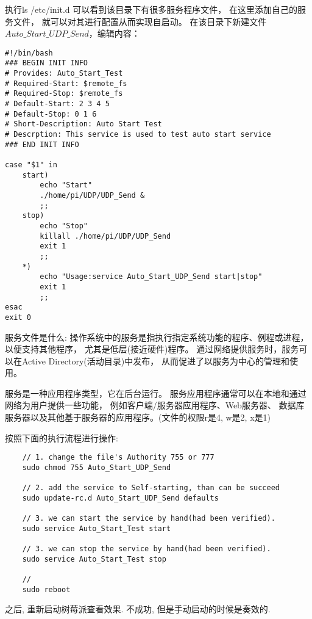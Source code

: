 执行ls /etc/init.d 
可以看到该目录下有很多服务程序文件，
在这里添加自己的服务文件，
就可以对其进行配置从而实现自启动。
在该目录下新建文件 $Auto\_Start\_UDP\_Send$，编辑内容：
\begin{lstlisting}[title=服务文件配置]
#!/bin/bash
### BEGIN INIT INFO
# Provides: Auto_Start_Test
# Required-Start: $remote_fs
# Required-Stop: $remote_fs
# Default-Start: 2 3 4 5
# Default-Stop: 0 1 6
# Short-Description: Auto Start Test 
# Descrption: This service is used to test auto start service
### END INIT INFO

case "$1" in
    start)
        echo "Start"
        ./home/pi/UDP/UDP_Send &
        ;;
    stop)
        echo "Stop"
        killall ./home/pi/UDP/UDP_Send
        exit 1
        ;;
    *)
        echo "Usage:service Auto_Start_UDP_Send start|stop"
        exit 1
        ;;
esac
exit 0
\end{lstlisting}
\par 服务文件是什么: 
操作系统中的服务是指执行指定系统功能的程序、例程或进程，以便支持其他程序，
尤其是低层(接近硬件)程序。
通过网络提供服务时，服务可以在Active Directory(活动目录)中发布，
从而促进了以服务为中心的管理和使用。
\par 服务是一种应用程序类型，它在后台运行。
服务应用程序通常可以在本地和通过网络为用户提供一些功能，
例如客户端/服务器应用程序、Web服务器、
数据库服务器以及其他基于服务器的应用程序。(文件的权限r是4, w是2, x是1)
\par 按照下面的执行流程进行操作:
\begin{lstlisting}
    // 1. change the file's Authority 755 or 777
    sudo chmod 755 Auto_Start_UDP_Send

    // 2. add the service to Self-starting, than can be succeed
    sudo update-rc.d Auto_Start_UDP_Send defaults

    // 3. we can start the service by hand(had been verified).
    sudo service Auto_Start_Test start

    // 3. we can stop the service by hand(had been verified).
    sudo service Auto_Start_Test stop

    // 
    sudo reboot
\end{lstlisting}
之后, 重新启动树莓派查看效果. 不成功, 但是手动启动的时候是奏效的. 

